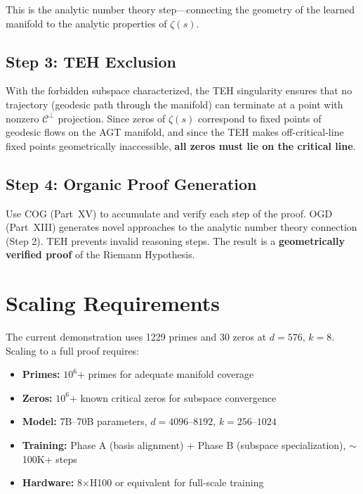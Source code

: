 \documentclass{article}
\begin{document}
This is the analytic number theory step---connecting the geometry of the
learned manifold to the analytic properties of $\zeta(s)$.

\subsection{Step 3: TEH Exclusion}

With the forbidden subspace characterized, the TEH singularity ensures that
no trajectory (geodesic path through the manifold) can terminate at a point
with nonzero $\mathcal{C}^\perp$ projection.  Since zeros of $\zeta(s)$
correspond to fixed points of geodesic flows on the AGT manifold, and since
the TEH makes off-critical-line fixed points geometrically inaccessible,
\textbf{all zeros must lie on the critical line}.

\subsection{Step 4: Organic Proof Generation}

Use COG (Part~XV) to accumulate and verify each step of the proof.  OGD
(Part~XIII) generates novel approaches to the analytic number theory
connection (Step 2).  TEH prevents invalid reasoning steps.  The result
is a \textbf{geometrically verified proof} of the Riemann Hypothesis.

\section{Scaling Requirements}
\label{sec:scaling}

The current demonstration uses 1229 primes and 30 zeros at $d=576$, $k=8$.
Scaling to a full proof requires:

\begin{itemize}
  \item \textbf{Primes:} $10^6$+ primes for adequate manifold coverage
  \item \textbf{Zeros:} $10^6$+ known critical zeros for subspace convergence
  \item \textbf{Model:} 7B--70B parameters, $d = 4096$--$8192$, $k = 256$--$1024$
  \item \textbf{Training:} Phase A (basis alignment) + Phase B (subspace specialization), $\sim$100K+ steps
  \item \textbf{Hardware:} 8$\times$H100 or equivalent for full-scale training
\end{itemize}
\end{document}
